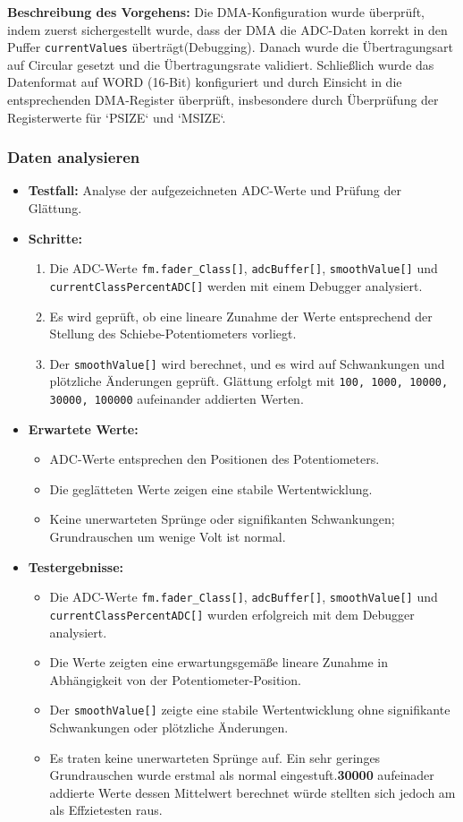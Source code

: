 \textbf{Beschreibung des Vorgehens:}
Die DMA-Konfiguration wurde überprüft, indem zuerst sichergestellt wurde, dass der DMA die ADC-Daten korrekt in den Puffer \texttt{currentValues} überträgt(Debugging). Danach wurde die Übertragungsart auf Circular gesetzt und die Übertragungsrate validiert. Schließlich wurde das Datenformat auf WORD (16-Bit) konfiguriert und durch Einsicht in die entsprechenden DMA-Register überprüft, insbesondere durch Überprüfung der Registerwerte für `PSIZE` und `MSIZE`.

\subsubsection{Daten analysieren}
\begin{itemize}
	\item \textbf{Testfall:} Analyse der aufgezeichneten ADC-Werte und Prüfung der Glättung.
	\item \textbf{Schritte:}
	\begin{enumerate}
		\item Die ADC-Werte \texttt{fm.fader\_Class[]}, \texttt{adcBuffer[]}, \texttt{smoothValue[]} und \texttt{currentClassPercentADC[]} werden mit einem Debugger analysiert.
		\item Es wird geprüft, ob eine lineare Zunahme der Werte entsprechend der Stellung des Schiebe-Potentiometers vorliegt.
		\item Der \texttt{smoothValue[]} wird berechnet, und es wird auf Schwankungen und plötzliche Änderungen geprüft. Glättung erfolgt mit \texttt{100, 1000, 10000, 30000, 100000} aufeinander addierten Werten.
	\end{enumerate}
	\item \textbf{Erwartete Werte:} 
	\begin{itemize}
		\item ADC-Werte entsprechen den Positionen des Potentiometers.
		\item Die geglätteten Werte zeigen eine stabile Wertentwicklung.
		\item Keine unerwarteten Sprünge oder signifikanten Schwankungen; Grundrauschen um wenige Volt ist normal.
	\end{itemize}
	\item \textbf{Testergebnisse:}
	\begin{itemize}
		\item Die ADC-Werte \texttt{fm.fader\_Class[]}, \texttt{adcBuffer[]}, \texttt{smoothValue[]} und \texttt{currentClassPercentADC[]} wurden erfolgreich mit dem Debugger analysiert.
		\item Die Werte zeigten eine erwartungsgemäße lineare Zunahme in Abhängigkeit von der Potentiometer-Position.
		\item Der \texttt{smoothValue[]} zeigte eine stabile Wertentwicklung ohne signifikante Schwankungen oder plötzliche Änderungen.
		\item Es traten keine unerwarteten Sprünge auf. Ein sehr geringes Grundrauschen wurde erstmal als normal eingestuft.\textbf{30000} aufeinader addierte Werte dessen Mittelwert berechnet würde stellten sich jedoch am als Effzietesten raus.
	\end{itemize}
\end{itemize}

